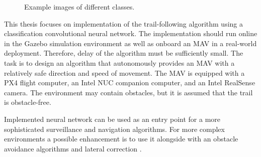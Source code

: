 \begin{figure}[!h]
\begin{minipage}{.5\linewidth}
  \end{minipage}\par\medskip
  \centering
  \caption{Example images of different classes.}
  \label{fig:classes}
\end{figure}

This thesis focuses on implementation of the trail-following algorithm using a classification convolutional neural network. The implementation should run online in the Gazebo simulation environment as well as onboard an \acs{MAV} in a real-world deployment. Therefore, delay of the algorithm must be sufficiently small. The task is to design an algorithm that autonomously provides an \acs{MAV} with a relatively safe direction and speed of movement. The \acs{MAV} is equipped with a PX4 flight computer, an Intel NUC companion computer, and an Intel RealSense camera. The environment may contain obstacles, but it is assumed that the trail is obstacle-free. 

Implemented neural network can be used as an entry point for a more sophisticated surveillance and navigation algorithms. For more complex environments a possible enhancement is to use it alongside with an obstacle avoidance algorithms and lateral correction \cite{back2020autonomous, maciel2018extending, smolyanskiy2017toward}.















